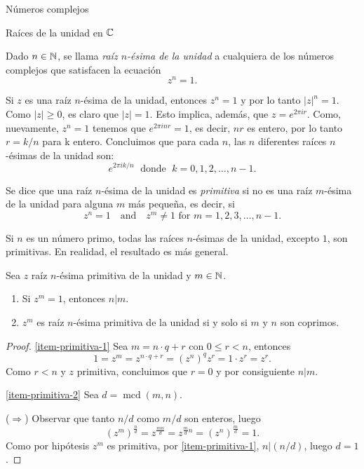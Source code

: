 \begin{chapter}{N\'umeros complejos}
\begin{section}{Raíces de la unidad en $\mathbb C$}
  \begin{definicion}
      Dado $n \in \mathbb N$, se llama \textit{raíz $n$-ésima de la unidad} a cualquiera de los números complejos que satisfacen la ecuación
      $$
          z^n = 1.
      $$
  \end{definicion}

  Si $z$  es una raíz $n$-ésima de la unidad,  entonces $z^n=1$ y por lo tanto $|z|^n = 1$. Como $|z|\ge 0$,  es claro que  $|z|=1$. Esto implica, además,  que $z =  e^{2 \pi i r}$. Como, nuevamente,   $z^n=1$ tenemos que $ e^{2 \pi i nr}=1$,  es decir,  $nr$ es entero, por lo tanto $r = k/n$ para k  entero. Concluimos que para cada $n$, las $n$ diferentes raíces $n$-ésimas de la unidad son:
  $$
      e^{2 \pi i k/n} \;\text{ donde }\;  k = 0, 1, 2, \ldots, n-1.
  $$

  Se dice que una raíz $n$-ésima de la unidad es \textit{primitiva} si no es una raíz $m$-ésima de la unidad para alguna $m$ más pequeña, es decir, si
  $$
      z^{n}=1\quad \text{and}\quad z^{m}\neq 1\text{ for } m=1,2,3,\ldots ,n-1.
  $$

  Si $n$ es un número primo, todas las raíces $n$-ésimas de la unidad, excepto $1$, son primitivas. En  realidad,  el resultado es más general.

  \begin{proposicion}
      Sea $z$ raíz $n$-ésima primitiva de la unidad y $m \in \mathbb N$.
      \begin{enumerate}
          \item\label{item-primitiva-1} Si $z^m=1$,  entonces $n|m$.
          \item\label{item-primitiva-2} $z^m$  es raíz $n$-ésima primitiva de la unidad si y solo si $m$ y $n$  son coprimos.
      \end{enumerate}

  \end{proposicion}
  \begin{proof}
      \ref{item-primitiva-1} Sea $m = n\cdot q + r$ con $0 \le r < n$, entonces $$1 = z^m = z^{n\cdot q + r} = (z^{n})^qz^r = 1 \cdot z^r = z^r.$$ Como $r<n$ y $z$ primitiva, concluimos que $r=0$ y por consiguiente $n|m$.

      \ref{item-primitiva-2} Sea $d = \operatorname{mcd}(m, n)$.

      ($\Rightarrow$) Observar que tanto $n/d$ como $m/d$ son enteros, luego
      $$
          (z^m)^{\frac{n}{d}} = z^{\frac{mn}{d}} = z^{\frac{m}{d}n} = (z^n)^{\frac{m}{d}} = 1.
      $$
      Como por hipótesis $z^m$ es primitiva, por \ref{item-primitiva-1}, $n | (n/d)$, luego $d=1$.


\end{proof}
\end{section}
\end{chapter}
